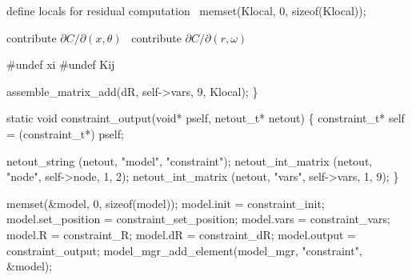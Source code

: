     \LA{}define locals for residual computation~{\nwtagstyle{}}\RA{}
    memset(Klocal, 0, sizeof(Klocal));

    \LA{}contribute $\partial C / \partial (x, \theta)$~{\nwtagstyle{}}\RA{}
    \LA{}contribute $\partial C / \partial (r, \omega)$~{\nwtagstyle{}}\RA{}

    #undef xi
    #undef Kij

    assemble_matrix_add(dR, self->vars, 9, Klocal);
\}

\nwendcode{}\nwdocspar

\nwenddocs{}\plusendmoddef
static void constraint_output(void* pself, netout_t* netout)
\{
    constraint_t* self = (constraint_t*) pself;

    netout_string        (netout, "model",     "constraint");
    netout_int_matrix    (netout, "node",      self->node, 1, 2);
    netout_int_matrix    (netout, "vars",      self->vars, 1, 9);
\}

\nwendcode{}\nwdocspar

\nwenddocs{}\plusendmoddef
memset(&model, 0, sizeof(model));
model.init         = constraint_init;
model.set_position = constraint_set_position;
model.vars         = constraint_vars;
model.R            = constraint_R;
model.dR           = constraint_dR;
model.output       = constraint_output;
model_mgr_add_element(model_mgr, "constraint", &model);

\nwendcode{}

